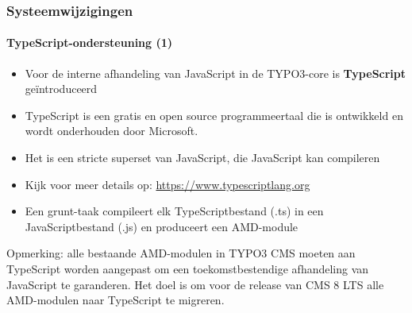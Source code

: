 \begin{frame}[fragile]
	\frametitle{Systeemwijzigingen}
	\framesubtitle{TypeScript-ondersteuning (1)}

	\begin{itemize}
		\item Voor de interne afhandeling van JavaScript in de TYPO3-core is \textbf{TypeScript} geïntroduceerd 
		\item TypeScript is een gratis en open source programmeertaal die is ontwikkeld en wordt onderhouden door Microsoft. 
		\item Het is een stricte superset van JavaScript, die JavaScript kan compileren
		\item Kijk voor meer details op: \url{https://www.typescriptlang.org}
		\item Een grunt-taak compileert elk TypeScriptbestand (.ts) in een JavaScriptbestand (.js) 
				en produceert een AMD-module
	\end{itemize}

	\small
		Opmerking: alle bestaande AMD-modulen in TYPO3 CMS moeten aan TypeScript worden aangepast om 
		een toekomstbestendige afhandeling van JavaScript te garanderen.
		Het doel is om voor de release van CMS 8 LTS alle AMD-modulen naar TypeScript te migreren.
	\normalsize

\end{frame}


